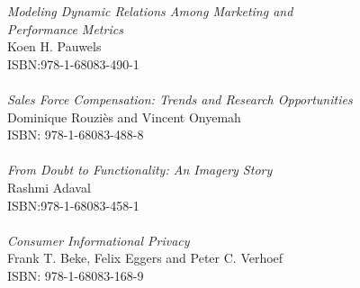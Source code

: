 \vspace{12pt}
\noindent \textit{Modeling Dynamic Relations Among Marketing and\\ Performance Metrics}\\
Koen H. Pauwels \\
ISBN:978-1-68083-490-1\\
\\
\noindent \textit{Sales Force Compensation: Trends and Research Opportunities}\\
Dominique Rouziès and Vincent Onyemah\\
ISBN: 978-1-68083-488-8\\
\\
\noindent \textit{From Doubt to Functionality: An Imagery Story}\\
Rashmi Adaval\\
ISBN:978-1-68083-458-1\\
\\
\noindent \textit{Consumer Informational Privacy}\\
Frank T. Beke, Felix Eggers and Peter C. Verhoef \\
ISBN: 978-1-68083-168-9

